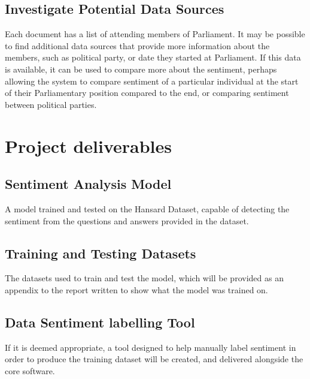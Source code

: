 \documentclass[11pt,fleqn,twoside]{article}
\begin{document}
\subsection{Investigate Potential Data Sources}
Each document has a list of attending members of Parliament. It may be possible to find additional data sources that provide more information about the members, such as political party, or date they started at Parliament. If this data is available, it can be used to compare more about the sentiment, perhaps allowing the system to compare sentiment of a particular individual at the start of their Parliamentary position compared to the end, or comparing sentiment between political parties.


\section{Project deliverables}
\subsection{Sentiment Analysis Model}
A model trained and tested on the Hansard Dataset, capable of detecting the sentiment from the questions and answers provided in the dataset.
\subsection{Training and Testing Datasets}
The datasets used to train and test the model, which will be provided as an appendix to the report written to show what the model was trained on.
\subsection{Data Sentiment labelling Tool}
If it is deemed appropriate, a tool designed to help manually label sentiment in order to produce the training dataset will be created, and delivered alongside the core software.

%
%
\section*{}
%
\end{document}
